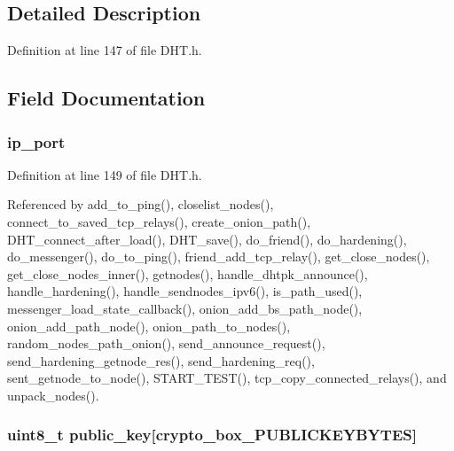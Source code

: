 \subsection{Detailed Description}


Definition at line 147 of file D\+H\+T.\+h.



\subsection{Field Documentation}
\hypertarget{struct_node__format_a86e2a5a56c0dd22df6e8b8a10e40f9e4}{
\subsubsection[{ip\+\_\+port}]{ ip\+\_\+port}}\label{struct_node__format_a86e2a5a56c0dd22df6e8b8a10e40f9e4}


Definition at line 149 of file D\+H\+T.\+h.



Referenced by add\+\_\+to\+\_\+ping(), closelist\+\_\+nodes(), connect\+\_\+to\+\_\+saved\+\_\+tcp\+\_\+relays(), create\+\_\+onion\+\_\+path(), D\+H\+T\+\_\+connect\+\_\+after\+\_\+load(), D\+H\+T\+\_\+save(), do\+\_\+friend(), do\+\_\+hardening(), do\+\_\+messenger(), do\+\_\+to\+\_\+ping(), friend\+\_\+add\+\_\+tcp\+\_\+relay(), get\+\_\+close\+\_\+nodes(), get\+\_\+close\+\_\+nodes\+\_\+inner(), getnodes(), handle\+\_\+dhtpk\+\_\+announce(), handle\+\_\+hardening(), handle\+\_\+sendnodes\+\_\+ipv6(), is\+\_\+path\+\_\+used(), messenger\+\_\+load\+\_\+state\+\_\+callback(), onion\+\_\+add\+\_\+bs\+\_\+path\+\_\+node(), onion\+\_\+add\+\_\+path\+\_\+node(), onion\+\_\+path\+\_\+to\+\_\+nodes(), random\+\_\+nodes\+\_\+path\+\_\+onion(), send\+\_\+announce\+\_\+request(), send\+\_\+hardening\+\_\+getnode\+\_\+res(), send\+\_\+hardening\+\_\+req(), sent\+\_\+getnode\+\_\+to\+\_\+node(), S\+T\+A\+R\+T\+\_\+\+T\+E\+S\+T(), tcp\+\_\+copy\+\_\+connected\+\_\+relays(), and unpack\+\_\+nodes().

\hypertarget{struct_node__format_aaa806bb1136fb3d4b5d8d8970b596ff7}{
\subsubsection[{public\+\_\+key}]{\setlength{\rightskip}{0pt plus 5cm}uint8\+\_\+t public\+\_\+key\mbox{[}crypto\+\_\+box\+\_\+\+P\+U\+B\+L\+I\+C\+K\+E\+Y\+B\+Y\+T\+E\+S\mbox{]}}}\label{struct_node__format_aaa806bb1136fb3d4b5d8d8970b596ff7}


